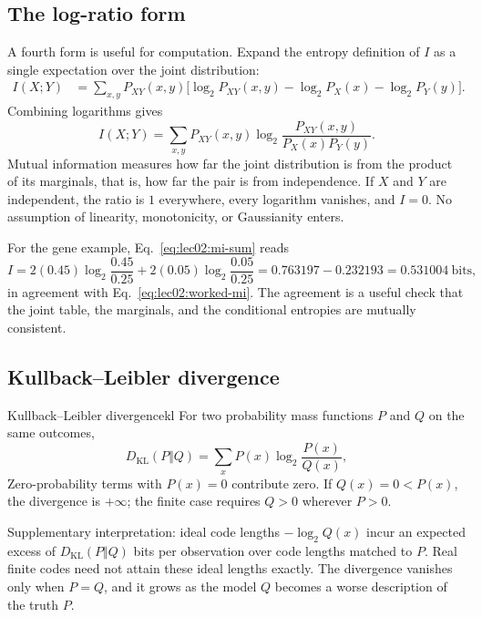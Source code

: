 \subsection{The log-ratio form}\label{subsec:lec02:log-ratio}
A fourth form is useful for computation. Expand the entropy definition of $I$ as a single expectation over the joint distribution:
\begin{align}
I(X;Y)&=\sum_{x,y}P_{XY}(x,y)\bigl[\log_2P_{XY}(x,y)-\log_2P_X(x)-\log_2P_Y(y)\bigr].\label{eq:lec02:mi-expansion}
\end{align}
Combining logarithms gives
\begin{equation}\label{eq:lec02:mi-sum}
\boxed{I(X;Y)=\sum_{x,y}P_{XY}(x,y)\log_2\frac{P_{XY}(x,y)}{P_X(x)P_Y(y)}.}
\end{equation}
Mutual information measures how far the joint distribution is from the product of its marginals, that is, how far the pair is from independence. If $X$ and $Y$ are independent, the ratio is $1$ everywhere, every logarithm vanishes, and $I=0$. No assumption of linearity, monotonicity, or Gaussianity enters.

For the gene example, Eq.~\eqref{eq:lec02:mi-sum} reads
\begin{equation}\label{eq:lec02:mi-check}
I=2(0.45)\log_2\frac{0.45}{0.25}+2(0.05)\log_2\frac{0.05}{0.25}
=0.763197-0.232193=0.531004\ \text{bits},
\end{equation}
in agreement with Eq.~\eqref{eq:lec02:worked-mi}. The agreement is a useful check that the joint table, the marginals, and the conditional entropies are mutually consistent.

\subsection{Kullback--Leibler divergence}\label{subsec:lec02:kl}
\begin{definition}{Kullback--Leibler divergence}{kl}
For two probability mass functions $P$ and $Q$ on the same outcomes,
\begin{equation}\label{eq:lec02:kl}
D_{\mathrm{KL}}(P\Vert Q)=\sum_xP(x)\log_2\frac{P(x)}{Q(x)},
\end{equation}
Zero-probability terms with $P(x)=0$ contribute zero. If $Q(x)=0<P(x)$, the divergence is $+\infty$; the finite case requires $Q>0$ wherever $P>0$.
\end{definition}
Supplementary interpretation: ideal code lengths $-\log_2Q(x)$ incur an expected excess of $D_{\mathrm{KL}}(P\Vert Q)$ bits per observation over code lengths matched to $P$. Real finite codes need not attain these ideal lengths exactly. The divergence vanishes only when $P=Q$, and it grows as the model $Q$ becomes a worse description of the truth $P$.

